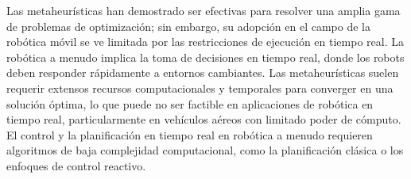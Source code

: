   Las metaheur\'{i}sticas han demostrado ser efectivas para resolver una amplia gama de problemas de optimizaci\'{o}n; sin embargo, su adopci\'{o}n en el campo de la rob\'{o}tica móvil se ve limitada por las restricciones de ejecución en tiempo real. La rob\'{o}tica a menudo implica la toma de decisiones en tiempo real, donde los robots deben responder r\'{a}pidamente a entornos cambiantes. Las metaheur\'{i}sticas suelen requerir extensos recursos computacionales y temporales para converger en una soluci\'{o}n \'{o}ptima, lo que puede no ser factible en aplicaciones de rob\'{o}tica en tiempo real, particularmente en vehículos aéreos con limitado poder de cómputo. El control y la planificaci\'{o}n en tiempo real en rob\'{o}tica a menudo requieren algoritmos de baja complejidad computacional, como la planificaci\'{o}n cl\'{a}sica o los enfoques de control reactivo.
  
    


